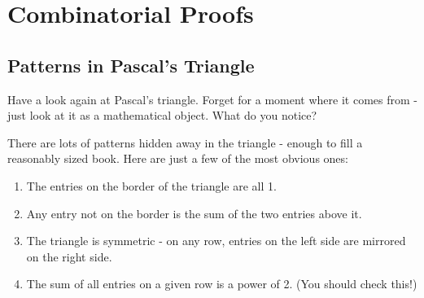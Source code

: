 \documentclass[12pt]{article}
\begin{document}
\section{Combinatorial Proofs}
\subsection{Patterns in Pascal's Triangle}

Have a look again at Pascal's triangle.  Forget for a moment where it comes from - just look at it as a mathematical object.  What do you notice?

\begin{center}
\noindent{}

\end{center}

There are lots of patterns hidden away in the triangle - enough to fill a reasonably sized book.  Here are just a few of the most obvious ones:
\begin{enumerate}
  \item The entries on the border of the triangle are all 1.
  \item Any entry not on the border is the sum of the two entries above it.
  \item The triangle is symmetric - on any row, entries on the left side are mirrored on the right side.
  \item The sum of all entries on a given row is a power of 2. (You should check this!)
\end{enumerate}
\end{document}
